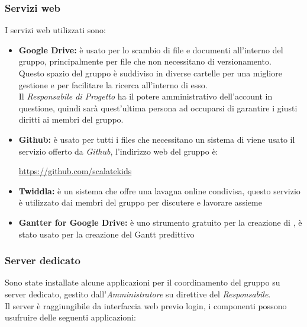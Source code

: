 \documentclass{scalatekids-article}
\begin{document}
\subsubsection{Servizi web}
I servizi web utilizzati sono:
\begin{itemize}
\item\textbf{Google Drive:} è usato per lo scambio di file e documenti all'interno del gruppo, principalmente per file che non necessitano di versionamento.\\
  Questo spazio del gruppo è suddiviso in diverse cartelle per una migliore gestione e per facilitare la ricerca all'interno di esso.\\
  Il \textit{Responsabile di Progetto} ha il potere amministrativo dell'account in questione, quindi sarà quest'ultima persona ad occuparsi di garantire i giusti diritti ai membri del gruppo.
\item\textbf{Github:} è usato per tutti i files che necessitano un sistema di  viene usato il servizio offerto da \textit{Github}, l'indirizzo web del gruppo è:\\
  \begin{center}
    \url{https://github.com/scalatekids}
  \end{center}
\item\textbf{Twiddla:} è un sistema che offre una lavagna online condivisa, questo servizio è utilizzato dai membri del gruppo per discutere e lavorare assieme %
\item\textbf{Gantter for Google Drive:} è uno strumento gratuito per la creazione di , è stato usato per la creazione del Gantt predittivo
\end{itemize}
\subsubsection{Server dedicato}
Sono state installate alcune applicazioni per il coordinamento del gruppo su
server dedicato, gestito dall'\textit{Amministratore} su direttive del
\textit{Responsabile}.\\ Il server è raggiungibile da interfaccia web previo
login, i componenti possono usufruire delle seguenti applicazioni:
\end{document}
